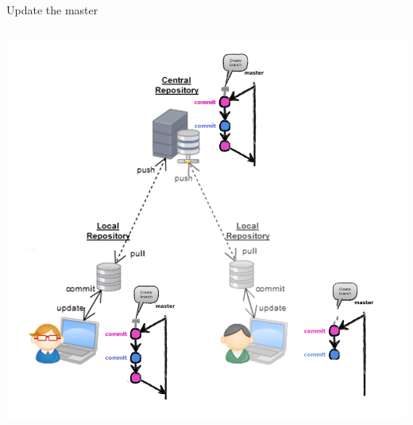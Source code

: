 \begin{frame}[fragile]{Update the master}
\begin{columns}
\begin{column}{0.6\textwidth}
\begin{center}
{			}\only<3-> {
				\includegraphics[width=.9\textwidth]{multiuser_remote_merge.png}
			}
		\end{center}
	\end{column}
\end{columns}
\end{frame}


